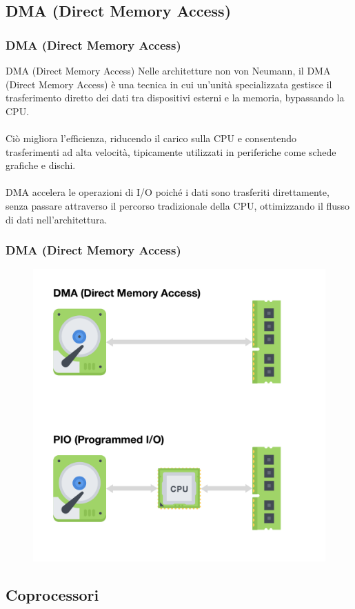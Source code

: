 \subsection[DMA (Direct Memory Access)]{DMA (Direct Memory Access)}
\begin{frame}
	\frametitle{ DMA (Direct Memory Access)}
	
	\begin{block}{DMA (Direct Memory Access)}
		Nelle architetture non von Neumann, il DMA (Direct Memory Access) è una tecnica in cui un'unità specializzata gestisce il trasferimento diretto dei dati tra dispositivi esterni e la memoria, bypassando la CPU.\\~\\
		Ciò migliora l'efficienza, riducendo il carico sulla CPU e consentendo trasferimenti ad alta velocità, tipicamente utilizzati in periferiche come schede grafiche e dischi.\\~\\
		DMA accelera le operazioni di I/O poiché i dati sono trasferiti direttamente, senza passare attraverso il percorso tradizionale della CPU, ottimizzando il flusso di dati nell'architettura.
	\end{block}
	
\end{frame}


\begin{frame}
	\frametitle{ DMA (Direct Memory Access)}
	
	\begin{figure}[!htbp]
		\centering 
		\includegraphics[width=0.6\linewidth]{images/7_pipeline/dma.pdf}
	\end{figure}
\end{frame}




\subsection[Coprocessori]{Coprocessori}


